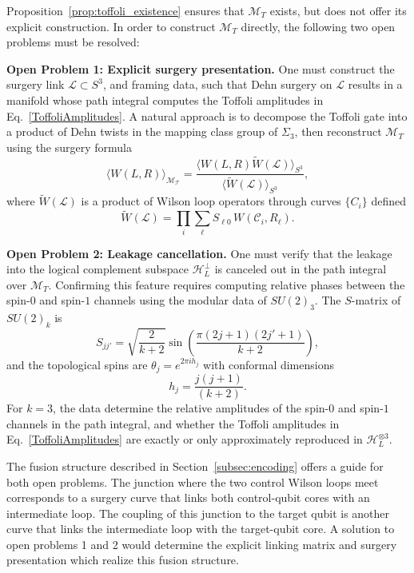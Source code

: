 \documentclass[12pt,a4paper]{article}
\begin{document}
Proposition~\ref{prop:toffoli_existence} ensures that $\mathcal{M}_T$ exists, but does not offer its explicit construction. In order to construct $\mathcal{M}_T$ directly, the following two open problems must be resolved:

\textbf{Open Problem 1: Explicit surgery presentation.} One must construct the surgery link $\mathcal{L} \subset S^3$, and framing data, such that Dehn surgery on $\mathcal{L}$ results in a manifold whose path integral computes the Toffoli amplitudes in Eq.\ \eqref{ToffoliAmplitudes}. A natural approach is to decompose the Toffoli gate into a product of Dehn twists in the mapping class group of $\Sigma_3$, then reconstruct $\mathcal{M}_T$ using the surgery formula~\cite{Salton:2016qpp}
%
\begin{equation}\label{SurgeryFormula}
\langle W(L,R)\rangle_{\mathcal{M_T}} = \frac{\langle W(L,R)\tilde{W}(\mathcal{L})\rangle_{S^3}}{\langle\tilde{W}(\mathcal{L})\rangle_{S^3}},
\end{equation}
%
where $\tilde{W}(\mathcal{L})$ is a product of Wilson loop operators through curves $\{C_i\}$ defined 
%
\begin{equation}
    \tilde{W}(\mathcal{L}) = \prod_i \sum_\ell S_{\ell 0}\, W(\mathcal{C}_i, R_\ell).
\end{equation}

\textbf{Open Problem 2: Leakage cancellation.} One must verify that the leakage into the logical complement subspace $\mathcal{H}_L^\perp$ is canceled out in the path integral over $\mathcal{M}_T$. Confirming this feature requires computing relative phases between the spin-$0$ and spin-$1$ channels using the modular data of $SU(2)_3$. The $S$-matrix of $SU(2)_k$ is~\cite{Witten1989}
%
\begin{equation}\label{SMatrix_SU2k}
S_{jj'} = \sqrt{\frac{2}{k+2}}\sin\left(\frac{\pi(2j+1)(2j'+1)}{k+2}\right),
\end{equation}
%
and the topological spins are $\theta_j = e^{2\pi i h_j}$ with conformal dimensions 
%
\begin{equation}
    h_j = \frac{j(j+1)}{(k+2)}.
\end{equation}
%
For $k = 3$, the data determine the relative amplitudes of the spin-$0$ and spin-$1$ channels in the path integral, and whether the Toffoli amplitudes in Eq.\ \eqref{ToffoliAmplitudes} are exactly or only approximately reproduced in $\mathcal{H}_L^{\otimes 3}$.

The fusion structure described in Section~\ref{subsec:encoding} offers a guide for both open problems. The junction where the two control Wilson loops meet corresponds to a surgery curve that links both control-qubit cores with an intermediate loop. The coupling of this junction to the target qubit is another curve that links the intermediate loop with the target-qubit core. A solution to open problems 1 and 2 would determine the explicit linking matrix and surgery presentation which realize this fusion structure.
\end{document}

